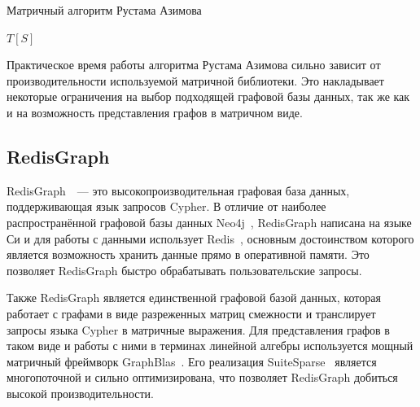 
\begin{algorithm}
\caption{Матричный алгоритм Рустама Азимова}

\begin{algorithmic}[1]
        \EndFor
    \EndFor    
        \EndFor
    \EndWhile
\State \Return $T[S]$
\EndFunction

\end{algorithmic}
\end{algorithm}

Практическое время работы алгоритма Рустама Азимова сильно зависит от производительности используемой матричной библиотеки. Это накладывает некоторые ограничения на выбор подходящей графовой базы данных, так же как и на возможность представления графов в матричном виде.

\subsection{RedisGraph}
RedisGraph~\cite{redis-graph}~--- это высокопроизводительная графовая база данных, поддерживающая язык запросов Cypher. В отличие от наиболее распространённой графовой базы данных Neo4j~\cite{neo4j}, RedisGraph написана на языке Си и для работы с данными использует Redis~\cite{redis}, основным достоинством которого является возможность хранить данные прямо в оперативной памяти. Это позволяет RedisGraph быстро обрабатывать пользовательские запросы.

Также RedisGraph является единственной графовой базой данных, которая работает с графами в виде разреженных матриц смежности и транслирует запросы языка Cypher в матричные выражения. Для представления графов в таком виде и работы с ними в терминах линейной алгебры используется мощный матричный фреймворк GraphBlas~\cite{graph-blas}. Его реализация SuiteSparse~\cite{suite-sparse} является многопоточной и сильно оптимизирована, что позволяет RedisGraph добиться высокой производительности.

